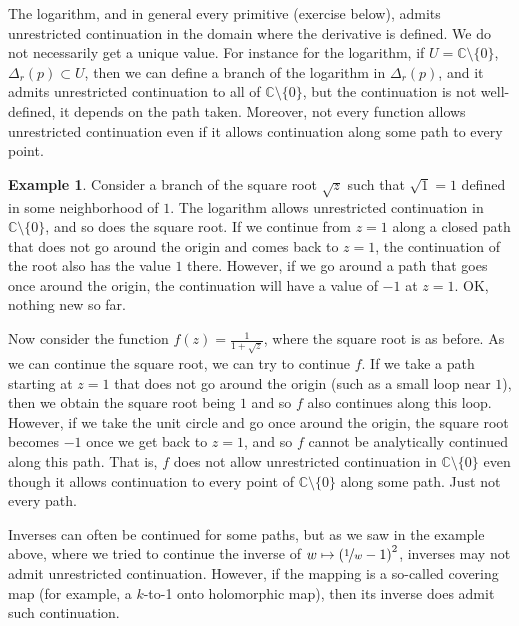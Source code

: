 \documentclass[12pt,openany]{book}
\newcommand{\C}{{\mathbb{C}}}
\theoremstyle{plain}
\theoremstyle{remark}
\theoremstyle{definition}
\theoremstyle{exercise}
\theoremstyle{example}
\newtheorem{example}[thm]{Example}
\begin{document}
The logarithm, and in general every primitive (exercise below),
admits unrestricted
continuation in the domain where the derivative is defined.
We do not necessarily get a unique value.
For instance for the logarithm,
if $U = \C \setminus \{ 0 \}$, $\Delta_r(p) \subset U$, then we
can define a branch of the logarithm in $\Delta_r(p)$, and it admits
unrestricted continuation
to all of $\C \setminus \{ 0 \}$, but the continuation
is not well-defined, it depends on the path taken.
Moreover,
not every function allows unrestricted continuation even if it allows
continuation along some path to every point.

\begin{example}
Consider a branch of the square root $\sqrt{z}$ such that $\sqrt{1}=1$
defined in some neighborhood of $1$.  The logarithm allows
unrestricted continuation in $\C \setminus \{ 0 \}$, and so does the square root.
If we continue from $z=1$ along a closed path that does not go around the origin and comes
back to $z=1$, the continuation of the root also has the value $1$ there.  However,
if we go around a path that goes once around the origin, the continuation
will have a value of $-1$ at $z=1$.  OK, nothing new so far.

Now consider the function $f(z) = \frac{1}{1+\sqrt{z}}$, where the square
root is as before.  As we can continue the square root, we can try to
continue $f$.  If we take a path starting at $z=1$ that does not go around the origin
(such as a small loop near $1$), then we obtain the square root being $1$
and so $f$ also continues along this loop.  However, if we take the
unit circle and go once around the origin, the square root becomes $-1$
once we get back to $z=1$,
and so $f$ cannot be analytically continued along this path.  That is, $f$
does not allow unrestricted continuation in $\C \setminus \{ 0 \}$ even
though it allows continuation to every point of $\C \setminus \{ 0 \}$
along some path.  Just not every path.
\end{example}

Inverses can often be continued for some paths, but as we saw in the
example above, where
we tried to continue the inverse of
$w \mapsto {(\nicefrac{1}{w}-1)}^2$, inverses may not admit 
unrestricted continuation.  However, if the mapping is a so-called covering
map (for example, a $k$-to-1 onto holomorphic map), then its inverse does
admit such continuation.
\end{document}
